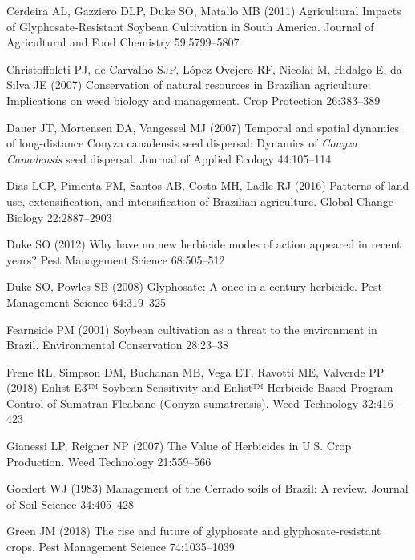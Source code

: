 \documentclass[
  12pt,
  a4paper]{article}
\begin{document}
\leavevmode\hypertarget{ref-cerdeira_agricultural_2011}{}%
Cerdeira AL, Gazziero DLP, Duke SO, Matallo MB (2011) Agricultural
Impacts of Glyphosate-Resistant Soybean Cultivation in South America.
Journal of Agricultural and Food Chemistry 59:5799--5807

\leavevmode\hypertarget{ref-christoffoleti_conservation_2007}{}%
Christoffoleti PJ, de Carvalho SJP, López-Ovejero RF, Nicolai M, Hidalgo
E, da Silva JE (2007) Conservation of natural resources in Brazilian
agriculture: Implications on weed biology and management. Crop
Protection 26:383--389

\leavevmode\hypertarget{ref-dauer_temporal_2007}{}%
Dauer JT, Mortensen DA, Vangessel MJ (2007) Temporal and spatial
dynamics of long-distance Conyza canadensis seed dispersal: Dynamics of
\emph{Conyza} \emph{Canadensis} seed dispersal. Journal of Applied
Ecology 44:105--114

\leavevmode\hypertarget{ref-dias_patterns_2016}{}%
Dias LCP, Pimenta FM, Santos AB, Costa MH, Ladle RJ (2016) Patterns of
land use, extensification, and intensification of Brazilian agriculture.
Global Change Biology 22:2887--2903

\leavevmode\hypertarget{ref-duke_why_2012}{}%
Duke SO (2012) Why have no new herbicide modes of action appeared in
recent years? Pest Management Science 68:505--512

\leavevmode\hypertarget{ref-duke_glyphosate:_2008}{}%
Duke SO, Powles SB (2008) Glyphosate: A once-in-a-century herbicide.
Pest Management Science 64:319--325

\leavevmode\hypertarget{ref-fearnside_soybean_2001}{}%
Fearnside PM (2001) Soybean cultivation as a threat to the environment
in Brazil. Environmental Conservation 28:23--38

\leavevmode\hypertarget{ref-frene_enlist_2018}{}%
Frene RL, Simpson DM, Buchanan MB, Vega ET, Ravotti ME, Valverde PP
(2018) Enlist E3™ Soybean Sensitivity and Enlist™ Herbicide-Based
Program Control of Sumatran Fleabane (Conyza sumatrensis). Weed
Technology 32:416--423

\leavevmode\hypertarget{ref-gianessi_value_2007}{}%
Gianessi LP, Reigner NP (2007) The Value of Herbicides in U.S. Crop
Production. Weed Technology 21:559--566

\leavevmode\hypertarget{ref-goedert_management_1983}{}%
Goedert WJ (1983) Management of the Cerrado soils of Brazil: A review.
Journal of Soil Science 34:405--428

\leavevmode\hypertarget{ref-green_rise_2018}{}%
Green JM (2018) The rise and future of glyphosate and
glyphosate-resistant crops. Pest Management Science 74:1035--1039
\end{document}
